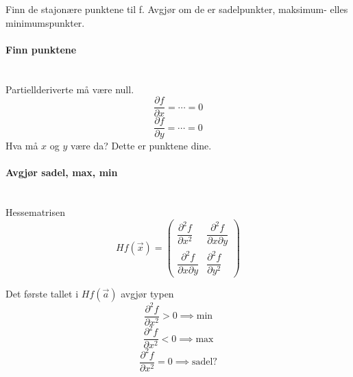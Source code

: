 Finn de stajonære punktene til f.
Avgjør om de er sadelpunkter, maksimum- elles minimumspunkter.



\paragraph{Finn punktene} \mbox{} \\
Partiellderiverte må være null.
$$\frac{\partial f}{\partial x} = \cdots = 0$$
$$\frac{\partial f}{\partial y} = \cdots = 0$$
Hva må $x$ og $y$ være da?
Dette er punktene dine.



\paragraph{Avgjør sadel, max, min} \mbox{} \\
Hessematrisen
$$Hf(\vec{x}) = \begin{pmatrix}
                \dfrac{\partial^2f}{\partial x^2}
                  & \dfrac{\partial^2f}{\partial x \partial y} \\[18pt]
                \dfrac{\partial^2f}{\partial x \partial y}
                  & \dfrac{\partial^2f}{\partial y^2}
                \end{pmatrix}$$

Det første tallet i $Hf(\vec{a})$ avgjør typen
$$\frac{\partial^2f}{\partial x^2} > 0 \implies \text{min}$$
$$\frac{\partial^2f}{\partial x^2} < 0 \implies \text{max}$$
$$\frac{\partial^2f}{\partial x^2} = 0 \implies \text{sadel?}$$
